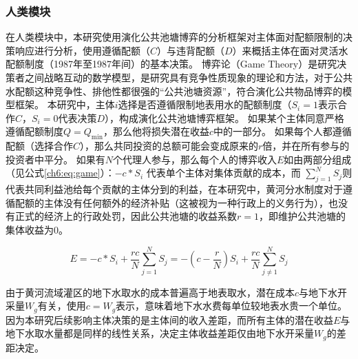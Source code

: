 \subsubsection{人类模块}\label{ch6:sec:society}

在人类模块中，本研究使用演化公共池塘博弈的分析框架对主体面对配额限制的决策响应进行分析，使用遵循配额（$C$）与违背配额（$D$）来概括主体在面对灵活水配额制度（1987年至1987年间）的基本决策。
博弈论（Game Theory）是研究决策者之间战略互动的数学模型，是研究具有竞争性质现象的理论和方法，对于公共水配额这种竞争性、排他性都很强的“公共池塘资源”，符合演化公共物品博弈的模型框架\cite{ostrom2009, traulsen2010}。
本研究中，主体$i$选择是否遵循限制地表用水的配额制度（$S_i = 1$表示合作$C$，$S_i=0$代表决策$D$），构成演化公共池塘博弈框架。
如果某个主体同意严格遵循配额制度$Q = Q_{\min}$，那么他将损失潜在收益$c$中的一部分。
如果每个人都遵循配额（选择合作$C$），那么共同投资的总额可能会变成原来的$r$倍，并在所有参与的投资者中平分。
如果有$N$个代理人参与，那么每个人的博弈收入$E$如由两部分组成（见公式\ref{ch6:eq:game}）：$-c*S_i$ 代表单个主体对集体贡献的成本，而 $\sum_{j=1}^N S_j$则代表共同利益池给每个贡献的主体分到的利益，在本研究中，黄河分水制度对于遵循配额的主体没有任何额外的经济补贴（这被视为一种行政上的义务行为），也没有正式的经济上的行政处罚，因此公共池塘的收益系数$r = 1$，即维护公共池塘的集体收益为$0$。

\begin{equation}
    \label{ch6:eq:game}
    E=-c * S_i+\frac{r c}{N} \sum_{j=1}^N S_j=-\left(c-\frac{r}{N}\right) S_i+\frac{r c}{N} \sum_{j \neq 1}^N S_j
\end{equation}

由于黄河流域灌区的地下水取水的成本普遍高于地表取水，潜在成本$c$与地下水开采量$W_g$有关，使用$c = W_g$表示，意味着地下水水费每单位较地表水贵一个单位。
因为本研究后续影响主体决策的是主体间的收入差距，而所有主体的潜在收益$E$与地下水取水量都是同样的线性关系，决定主体收益差距仅由地下水开采量$W_g$的差距决定。

